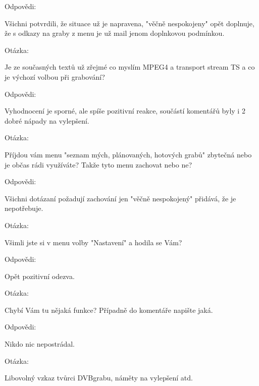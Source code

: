 \begin{bf}Odpovědi:\end{bf} Všichni potvrdili, že situace už je napravena, "věčně nespokojeny" opět doplnuje, že s odkazy na graby z menu je už mail jenom doplnkovou podmínkou.
							
\vspace{10pt}

\begin{bf}Otázka:\end{bf} Je ze současných textů už zřejmé co myslím MPEG4 a transport stream TS a co je výchozí volbou při grabování?

\begin{bf}Odpovědi:\end{bf} Vyhodnocení je sporné, ale spíše pozitivní reakce, součástí komentářů byly i 2 dobré nápady na vylepšení.
							
\vspace{10pt}

\begin{bf}Otázka:\end{bf} Příjdou vám menu "seznam mých, plánovaných, hotových grabů" zbytečná nebo je občas rádi využíváte? Takže tyto menu zachovat nebo ne?

\begin{bf}Odpovědi:\end{bf} Všichni dotázaní požadují zachování jen "věčně nespokojený" přidává, že je nepotřebuje.
							
\vspace{10pt}

\begin{bf}Otázka:\end{bf} Všimli jste si v menu volby "Nastavení" a hodila se Vám?	

\begin{bf}Odpovědi:\end{bf} Opět pozitivní odezva.
						
\vspace{10pt}

\begin{bf}Otázka:\end{bf} Chybí Vám tu nějaká funkce? Případně do komentáře napište jaká.

\begin{bf}Odpovědi:\end{bf} Nikdo nic nepostrádal.
				
\vspace{10pt}

\begin{bf}Otázka:\end{bf} Libovolný vzkaz tvůrci DVBgrabu, náměty na vylepšení atd.

